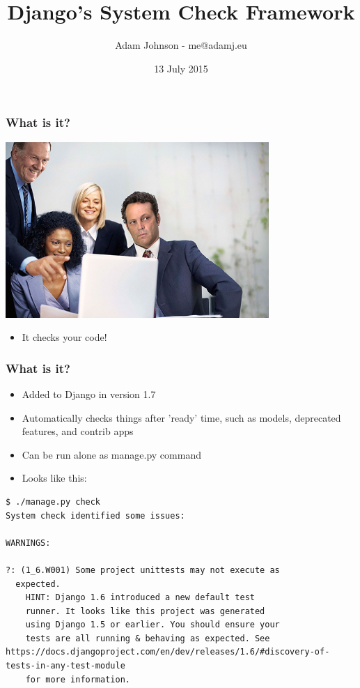 \documentclass{beamer}
\title{Django's System Check Framework}
\author{Adam Johnson - me@adamj.eu}
\date{13 July 2015}
\begin{document}
\maketitle


\begin{frame}[fragile]\frametitle{What is it?}

    \begin{center}
        \includegraphics[width=10cm]{checkit}
    \end{center}

    \begin{itemize}
        \item It checks your code!
    \end{itemize}

\end{frame}


\begin{frame}[fragile]\frametitle{What is it?}

    \begin{itemize}
        \item Added to Django in version 1.7
        \item Automatically checks things after 'ready' time, such as models, deprecated features, and contrib apps
        \item Can be run alone as manage.py command
        \item Looks like this:
    \end{itemize}

        \begin{lstlisting}
$ ./manage.py check
System check identified some issues:

WARNINGS:

?: (1_6.W001) Some project unittests may not execute as
  expected.
    HINT: Django 1.6 introduced a new default test
    runner. It looks like this project was generated
    using Django 1.5 or earlier. You should ensure your
    tests are all running & behaving as expected. See https://docs.djangoproject.com/en/dev/releases/1.6/#discovery-of-tests-in-any-test-module
    for more information.
    \end{lstlisting}

\end{frame}
\end{document}
